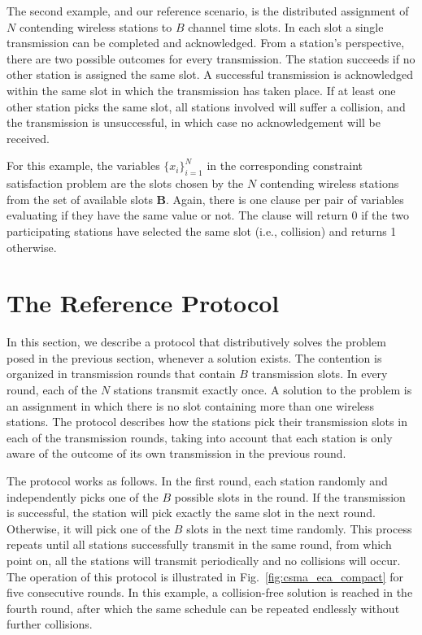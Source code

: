 \documentclass[journal]{IEEEtran}
\begin{document}
The second example, and our reference scenario, is the distributed assignment of $N$ contending wireless stations to $B$ channel time slots. 
In each slot a single transmission can be completed and acknowledged. 
From a station's perspective, there are two possible outcomes for every transmission.
The station succeeds if no other station is assigned the same slot. 
A successful transmission is acknowledged within the same slot in which the transmission has taken place.
If at least one other station picks the same slot, all stations involved will suffer a collision, and the transmission is unsuccessful, in which case no acknowledgement will be received.


For this example, the variables $\{x_i\}_{i=1}^{N}$ in the corresponding constraint satisfaction problem are the slots chosen by the $N$ contending wireless stations from the set of available slots $\mathbf{B}$. Again, there is one clause per pair of variables evaluating if they have the same value or not. The clause will return 0 if the two participating stations have selected the same slot (i.e., collision) and returns 1 otherwise.

\section{The Reference Protocol}

In this section, we describe a protocol that distributively solves the problem posed in the previous section, whenever a solution exists. The contention is organized in transmission rounds that contain $B$ transmission slots. In every round, each of the $N$ stations transmit exactly once. A solution to the problem is an assignment in which there is no slot containing more than one wireless stations. The protocol describes how the stations pick their transmission slots in each of the transmission rounds, taking into account that each station is only aware of the outcome of its own transmission in the previous round.

The protocol works as follows. In the first round, each station randomly and independently picks one of the $B$ possible slots in the round. If the transmission is successful, the station will pick exactly the same slot in the next round. Otherwise, it will pick one of the $B$ slots in the next time randomly. This process repeats until all stations successfully transmit in the same round, from which point on, all the stations will transmit periodically and no collisions will occur. The operation of this protocol is illustrated in Fig.~\ref{fig:csma_eca_compact} for five consecutive rounds. In this example, a collision-free solution is reached in the fourth round, after which the same schedule can be repeated endlessly without further collisions.
\end{document}

